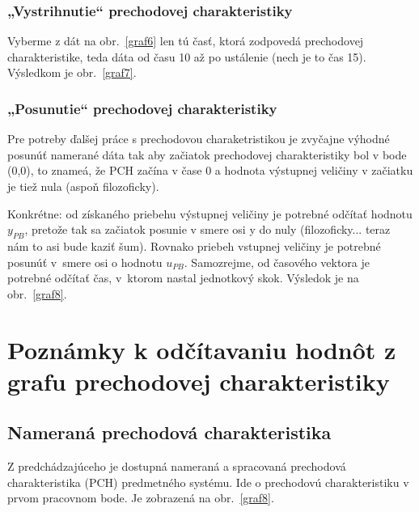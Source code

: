\documentclass[a4paper, 10pt, ]{article}
\begin{document}
\subsubsection{„Vystrihnutie“ prechodovej charakteristiky}

Vyberme z dát na obr.~\ref{graf6} len tú časť, ktorá zodpovedá prechodovej charakteristike, teda dáta od času 10 až po ustálenie (nech je to čas 15). Výsledkom je obr.~\ref{graf7}.





\subsubsection{„Posunutie“ prechodovej charakteristiky}



Pre potreby ďalšej práce s prechodovou charaketristikou je zvyčajne výhodné posunúť namerané dáta tak aby začiatok prechodovej charakteristiky bol v bode (0,0), to znameá, že PCH začína v  čase 0 a hodnota výstupnej veličiny v začiatku je tiež nula (aspoň filozoficky).


Konkrétne: od získaného priebehu výstupnej veličiny je potrebné odčítať hodnotu $y_{PB}$, pretože tak sa začiatok posunie v smere osi y do nuly (filozoficky... teraz nám to asi bude kaziť šum). Rovnako priebeh vstupnej veličiny je potrebné posunúť v~smere osi o hodnotu $u_{PB}$. Samozrejme, od časového vektora je potrebné odčítať čas, v~ktorom nastal jednotkový skok. Výsledok je na obr.~\ref{graf8}.










\section{Poznámky k odčítavaniu hodnôt z grafu prechodovej charakteristiky}



\subsection{Nameraná prechodová charakteristika}

Z predchádzajúceho je dostupná nameraná a spracovaná prechodová charakteristika (PCH) predmetného systému. Ide o prechodovú charakteristiku v prvom pracovnom bode. Je zobrazená na obr.~\ref{graf8}.


%
%
%
%
\end{document}
